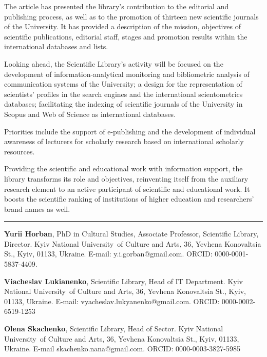 \documentclass[a4paper,
fontsize=11pt,
oneside,
numbers=noperiodatend,
parskip=half-,
bibliography=totoc,
final
]{scrartcl}
\begin{document}
The article has presented the library's contribution to the editorial
and publishing process, as well as to the promotion of thirteen new
scientific journals of the University. It has provided a description of
the mission, objectives of scientific publications, editorial staff,
stages and promotion results within the international databases and
lists.

Looking ahead, the Scientific Library's activity will be focused on the
development of information-analytical monitoring and bibliometric
analysis of communication systems of the University; a design for the
representation of scientists' profiles in the search engines and the
international scientometrics databases; facilitating the indexing of
scientific journals of the University in Scopus and Web of Science as
international databases.

Priorities include the support of e-publishing and the development of
individual awareness of lecturers for scholarly research based on
international scholarly resources.

Providing the scientific and educational work with information support,
the library transforms its role and objectives, reinventing itself from
the auxiliary research element to an active participant of scientific
and educational work. It boosts the scientific ranking of institutions
of higher education and researchers' brand names as well.

\begin{center}\rule{0.5\linewidth}{0.5pt}\end{center}

\textbf{Yurii Horban}, PhD in Cultural Studies, Associate Professor,
Scientific Library, Director. Kyiv National University~of Culture and
Arts, 36, Yevhena Konovaltsia St., Kyiv, 01133, Ukraine. E-mail:
y.i.gorban@gmail.com. ORCID: 0000-0001-5837-4409.

\textbf{Viacheslav Lukianenko}, Scientific Library, Head of IT
Department. Kyiv National University~of Culture and Arts, 36, Yevhena
Konovaltsia St., Kyiv, 01133, Ukraine. E-mail:
vyacheslav.lukyanenko@gmail.com. ORCID: 0000-0002-6519-1253

\textbf{Olena Skachenko}, Scientific Library, Head of Sector. Kyiv
National University~of Culture and Arts, 36, Yevhena Konovaltsia St.,
Kyiv, 01133, Ukraine. E-mail skachenko.nana@gmail.com. ORCID:
0000-0003-3827-5985
\end{document}
